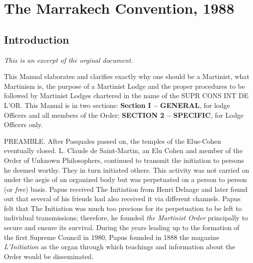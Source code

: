 \section{The Marrakech Convention, 1988}
\subsection{Introduction}
\textit{This is an excerpt of the orginal document.}

This Manual elaborates and clarifies exactly why one should be a Martinist, what Martinism is, the purpose of a Martinist Lodge and the proper procedures to be followed by Martinist Lodges chartered in the name of the SUPR\hexdot{} CONS\hexdot{} INT\hexdot{} DE L’OR\hexdot{}. This Manual is in two sections: \textbf{Section I – GENERAL}, for lodge Officers and all members of the Order; \textbf{SECTION 2 – SPECIFIC}, for Lodge Officers only. 

PREAMBLE. After Pasquales passed on, the temples of the Elus-Cohen eventually
closed. L. Claude de Saint-Martin, an Elu Cohen and member of the Order of Unknown
Philosophers, continued to transmit the \si{} initiation to persons he deemed worthy.
They in turn initiated others. This activity was not carried on under the aegis of an
organized body but was perpetuated on a person to person (or \textit{free}) basis. Papus received The
Initiation from Henri Delaage and later found out that several of his friends had also
received it via different channels. Papus felt that The Initiation was much too precious for
its perpetuation to be left to individual transmissions; therefore, he founded \textit{the Martinist
Order} principally to secure and ensure its survival. During the years leading up to the
formation of the first Supreme Council in 1980, Papus founded in 1888 the magazine
\textit{L’Initiation} as the organ through which teachings and information about the Order would be
disseminated.

